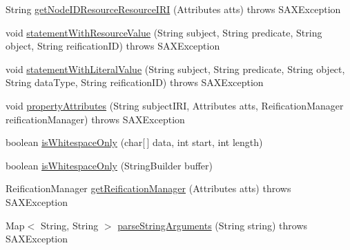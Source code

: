 \begin{DoxyCompactItemize}
String \hyperlink{classorg_1_1semanticweb_1_1owlapi_1_1rdf_1_1syntax_1_1_r_d_f_parser_a2d2467285f7ba2e24dc7d48cb77f070b}{get\-Node\-I\-D\-Resource\-Resource\-I\-R\-I} (Attributes atts)  throws S\-A\-X\-Exception 
\item 
void \hyperlink{classorg_1_1semanticweb_1_1owlapi_1_1rdf_1_1syntax_1_1_r_d_f_parser_a10d5326458c57ea7ffb579df91daa9b9}{statement\-With\-Resource\-Value} (String subject, String predicate, String object, String reification\-I\-D)  throws S\-A\-X\-Exception 
\item 
void \hyperlink{classorg_1_1semanticweb_1_1owlapi_1_1rdf_1_1syntax_1_1_r_d_f_parser_aa618c9030c4037249e1012cb56f1acf1}{statement\-With\-Literal\-Value} (String subject, String predicate, String object, String data\-Type, String reification\-I\-D)  throws S\-A\-X\-Exception 
\item 
void \hyperlink{classorg_1_1semanticweb_1_1owlapi_1_1rdf_1_1syntax_1_1_r_d_f_parser_a925cd506f5dde9b2103a7f482073768f}{property\-Attributes} (String subject\-I\-R\-I, Attributes atts, Reification\-Manager reification\-Manager)  throws S\-A\-X\-Exception 
\item 
boolean \hyperlink{classorg_1_1semanticweb_1_1owlapi_1_1rdf_1_1syntax_1_1_r_d_f_parser_a0ab13ccb0788816c65d61c7afbacb623}{is\-Whitespace\-Only} (char\mbox{[}$\,$\mbox{]} data, int start, int length)
\item 
boolean \hyperlink{classorg_1_1semanticweb_1_1owlapi_1_1rdf_1_1syntax_1_1_r_d_f_parser_a5c81fbd0097d6bca334dd83a72282187}{is\-Whitespace\-Only} (String\-Builder buffer)
\item 
Reification\-Manager \hyperlink{classorg_1_1semanticweb_1_1owlapi_1_1rdf_1_1syntax_1_1_r_d_f_parser_a65e2331c0a5f76b2f93b7ffe218dd768}{get\-Reification\-Manager} (Attributes atts)  throws S\-A\-X\-Exception 
\item 
Map$<$ String, String $>$ \hyperlink{classorg_1_1semanticweb_1_1owlapi_1_1rdf_1_1syntax_1_1_r_d_f_parser_ab99cf196235c47c0408e13c5f261faf7}{parse\-String\-Arguments} (String string)  throws S\-A\-X\-Exception 
\end{DoxyCompactItemize}
